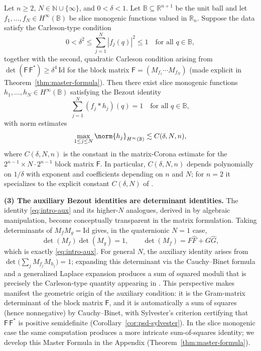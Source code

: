\documentclass[11pt]{amsart}
\begin{document}
\begin{thm}\label{thm:main-intro}
Let $n\ge 2$, $N\in\mathbb{N}\cup\{\infty\}$, and $0<\delta<1$.  Let $\mathbb B\subseteq\mathbb{R}^{n+1}$ be the unit ball and let $f_{1},\ldots,f_{N}\in H^\infty(\mathbb B)$ be slice monogenic functions valued in $\mathbb{R}_n$.  Suppose the data satisfy the Carleson-type condition
\[
0<\delta^2\le \sum_{j=1}^N |f_{j}(q)|^2\le 1\quad\text{for all }q\in \mathbb B,
\]
together with the second, quadratic Carleson condition arising from $\det(\mathsf{F}\,\mathsf{F}^\ast)\ge\delta^4\,\mathrm{Id}$ for the block matrix $\mathsf{F}=(M_{f_1}\cdots M_{f_N})$ (made explicit in Theorem~\ref{thm:master-formula}).  Then there exist slice monogenic functions $h_{1},\ldots,h_{N}\in H^\infty(\mathbb B)$ satisfying the Bezout identity
\[
\sum_{j=1}^{N} (f_{j}\ast h_{j})(q)=1\quad\text{for all }q\in \mathbb B,
\]
with norm estimates
\[
\max_{1\le j\le N}\norm{h_{j}}_{H^\infty(\mathbb B)}\lesssim C(\delta,N,n),
\]
where $C(\delta,N,n)$ is the constant in the matrix-Corona estimate for the $2^{n-1}\times N\cdot 2^{n-1}$ block matrix $\mathsf{F}$.  In particular, $C(\delta,N,n)$ depends polynomially on $1/\delta$ with exponent and coefficients depending on $n$ and $N$; for $n=2$ it specializes to the explicit constant $C(\delta,N)$ of \cite{CPSW}.
\end{thm}

\medskip
\noindent\textbf{(3) The auxiliary Bezout identities are determinant identities.}  The identity \eqref{eq:intro-aux} and its higher-$N$ analogues, derived in \cite{CPSW} by algebraic manipulation, become conceptually transparent in the matrix formulation.  Taking determinants of $M_fM_g=\mathrm{Id}$ gives, in the quaternionic $N=1$ case,
\[
\det(M_f)\det(M_g)=1,\qquad \det(M_f)={F}\hat{{F}}+G\hat{G},
\]
which is exactly \eqref{eq:intro-aux}.  For general $N$, the auxiliary identity arises from $\det\!\bigl(\sum_j M_{f_j}M_{h_j}\bigr)=1$; expanding this determinant via the Cauchy--Binet formula and a generalized Laplace expansion produces a sum of squared moduli that is precisely the Carleson-type quantity appearing in \cite{CPSW}.  This perspective makes manifest the geometric origin of the auxiliary condition: it is the Gram-matrix determinant of the block matrix $\mathsf{F}$, and it is automatically a sum of squares (hence nonnegative) by Cauchy--Binet, with Sylvester's criterion certifying that $\mathsf{F}\,\mathsf{F}^\ast$ is positive semidefinite (Corollary~\ref{cor:psd-sylvester}).  In the slice monogenic case the same computation produces a more intricate sum-of-squares identity; we develop this Master Formula in the Appendix (Theorem~\ref{thm:master-formula}).
\end{document}
